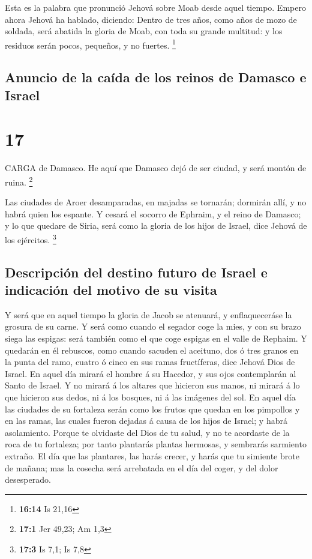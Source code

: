  Esta es la palabra que pronunció Jehová sobre Moab desde
aquel tiempo.  Empero ahora Jehová ha hablado, diciendo:
Dentro de tres años, como años de mozo de soldada, será abatida la
gloria de Moab, con toda su grande multitud: y los residuos serán pocos,
pequeños, y no fuertes. \footnote{\textbf{16:14} Is 21,16}

\hypertarget{anuncio-de-la-cauxedda-de-los-reinos-de-damasco-e-israel}{%
\subsection{Anuncio de la caída de los reinos de Damasco e
Israel}\label{anuncio-de-la-cauxedda-de-los-reinos-de-damasco-e-israel}}

\hypertarget{section-16}{%
\section{17}\label{section-16}}

 CARGA de Damasco. He aquí que Damasco dejó de ser ciudad, y
será montón de ruina. \footnote{\textbf{17:1} Jer 49,23; Am 1,3}

 Las ciudades de Aroer desamparadas, en majadas se tornarán;
dormirán allí, y no habrá quien los espante.  Y cesará el
socorro de Ephraim, y el reino de Damasco; y lo que quedare de Siria,
será como la gloria de los hijos de Israel, dice Jehová de los
ejércitos. \footnote{\textbf{17:3} Is 7,1; Is 7,8}

\hypertarget{descripciuxf3n-del-destino-futuro-de-israel-e-indicaciuxf3n-del-motivo-de-su-visita}{%
\subsection{Descripción del destino futuro de Israel e indicación del
motivo de su
visita}\label{descripciuxf3n-del-destino-futuro-de-israel-e-indicaciuxf3n-del-motivo-de-su-visita}}

 Y será que en aquel tiempo la gloria de Jacob se atenuará,
y enflaqueceráse la grosura de su carne.  Y será como cuando
el segador coge la mies, y con su brazo siega las espigas: será también
como el que coge espigas en el valle de Rephaim.  Y quedarán
en él rebuscos, como cuando sacuden el aceituno, dos ó tres granos en la
punta del ramo, cuatro ó cinco en sus ramas fructíferas, dice Jehová
Dios de Israel.  En aquel día mirará el hombre á su Hacedor,
y sus ojos contemplarán al Santo de Israel.  Y no mirará á
los altares que hicieron sus manos, ni mirará á lo que hicieron sus
dedos, ni á los bosques, ni á las imágenes del sol.  En
aquel día las ciudades de su fortaleza serán como los frutos que quedan
en los pimpollos y en las ramas, las cuales fueron dejadas á causa de
los hijos de Israel; y habrá asolamiento.  Porque te
olvidaste del Dios de tu salud, y no te acordaste de la roca de tu
fortaleza; por tanto plantarás plantas hermosas, y sembrarás sarmiento
extraño.  El día que las plantares, las harás crecer, y
harás que tu simiente brote de mañana; mas la cosecha será arrebatada en
el día del coger, y del dolor desesperado.

